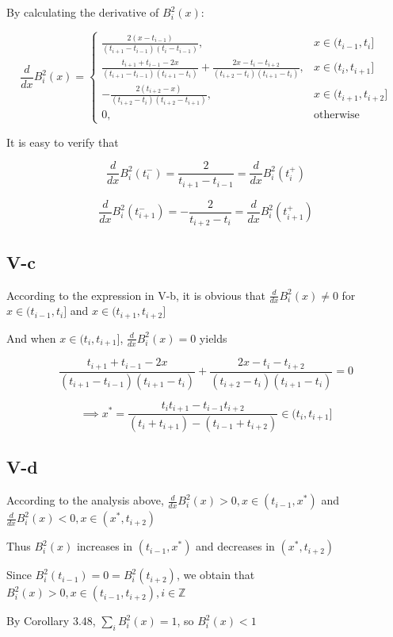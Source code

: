 \documentclass[a4paper]{article}
\begin{document}
By calculating the derivative of $B_i^2(x)$:

\[
\frac{d}{dx}B_i^2(x) = 
\begin{cases}
\frac{2(x - t_{i-1})}{(t_{i+1} - t_{i-1})(t_i - t_{i-1})}, & x \in (t_{i-1}, t_i] \\
\frac{t_{i+1} + t_{i-1} - 2x}{(t_{i+1} - t_{i-1})(t_{i+1} - t_i)} + \frac{2x - t_i - t_{i+2}}{(t_{i+2} - t_i)(t_{i+1} - t_i)}, & x \in (t_i, t_{i+1}] \\
-\frac{2(t_{i+2} - x)}{(t_{i+2} - t_i)(t_{i+2} - t_{i+1})}, & x \in (t_{i+1}, t_{i+2}] \\
0, & \text{otherwise}
\end{cases}
\]

It is easy to verify that 

$$\frac{d}{dx}B_i^2(t_i^-) = \frac{2}{t_{i+1}- t_{i-1}} = \frac{d}{dx}B_i^2(t_i^+)$$

$$\frac{d}{dx}B_i^2(t_{i+1}^-) = -\frac{2}{t_{i+2} - t_i} = \frac{d}{dx}B_i^2(t_{i+1}^+)$$


\subsection*{V-c}

According to the expression in V-b, it is obvious that $\frac{d}{dx}B_i^2(x) \neq 0$ for $x \in (t_{i-1}, t_i]$ and $x \in (t_{i+1}, t_{i+2}]$

And when $x \in (t_i, t_{i+1}]$, $\frac{d}{dx}B_i^2(x) = 0$ yields

$$\frac{t_{i+1} + t_{i-1} - 2x}{(t_{i+1} - t_{i-1})(t_{i+1} - t_i)} + \frac{2x - t_i - t_{i+2}}{(t_{i+2} - t_i)(t_{i+1} - t_i)} = 0$$

$$\implies x^* = \frac{t_i t_{i+1} - t_{i-1} t_{i+2}}{(t_i + t_{i+1}) - (t_{i-1} + t_{i+2})} \in (t_i, t_{i+1}]$$

\subsection*{V-d}

According to the analysis above, $\frac{d}{dx}B_i^2(x) > 0, x \in (t_{i-1}, x^*)$ and $\frac{d}{dx}B_i^2(x) < 0, x \in (x^*, t_{i+2})$

Thus $B_i^2(x)$ increases in $(t_{i-1}, x^*)$ and decreases in $(x^*, t_{i+2})$

Since $B_i^2(t_{i-1}) = 0 = B_i^2(t_{i+2})$, we obtain that $B_i^2(x) > 0, x \in (t_{i-1}, t_{i+2}), i \in \mathbb{Z}$

By Corollary 3.48, $\sum_i B_i^2(x) = 1$, so $B_i^2(x) < 1$
\end{document}
